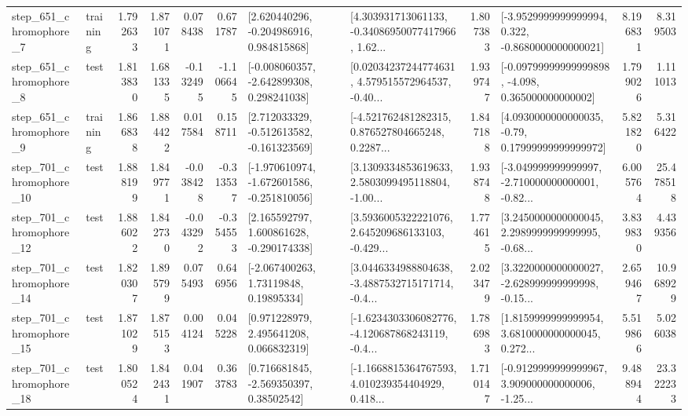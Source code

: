 \begin{tabular}{llrrrrllrlrr}
   step\_651\_chromophore\_7 &  training &      1.792633 &    1.871071 &      0.078438 &  0.671787 &    [2.620440296, -0.204986916, 0.984815868] &  [4.303931713061133, -0.34086950077417966, 1.62... &       1.807383 &  [-3.9529999999999994, 0.322, -0.8680000000000021] &            8.196831 &          8.319503 \\
   step\_651\_chromophore\_8 &      test &      1.813830 &    1.681335 &     -0.132495 & -1.106645 &   [-0.008060357, -2.642899308, 0.298241038] &  [0.02034237244774631, 4.579515572964537, -0.40... &       1.939747 &  [-0.09799999999999898, -4.098, 0.365000000000002] &            1.799026 &          1.111013 \\
   step\_651\_chromophore\_9 &  training &      1.866838 &    1.884422 &      0.017584 &  0.158711 &   [2.712033329, -0.512613582, -0.161323569] &  [-4.521762481282315, 0.876527804665248, 0.2287... &       1.847188 &   [4.0930000000000035, -0.79, 0.17999999999999972] &            5.821820 &          5.316422 \\
  step\_701\_chromophore\_10 &      test &      1.888199 &    1.849771 &     -0.038428 & -0.313537 &  [-1.970610974, -1.672601586, -0.251810056] &  [3.1309334853619633, 2.5803099495118804, -1.00... &       1.938748 &  [-3.049999999999997, -2.710000000000001, -0.82... &            6.005764 &         25.478518 \\
  step\_701\_chromophore\_12 &      test &      1.886022 &    1.842730 &     -0.043292 & -0.354553 &    [2.165592797, 1.600861628, -0.290174338] &  [3.5936005322221076, 2.645209686133103, -0.429... &       1.774615 &  [3.2450000000000045, 2.2989999999999995, -0.68... &            3.839830 &          4.439356 \\
  step\_701\_chromophore\_14 &      test &      1.820307 &    1.895799 &      0.075493 &  0.646956 &      [-2.067400263, 1.73119848, 0.19895334] &  [3.0446334988804638, -3.4887532715171714, -0.4... &       2.023479 &  [3.3220000000000027, -2.628999999999998, -0.15... &            2.659467 &         10.968929 \\
  step\_701\_chromophore\_15 &      test &      1.871029 &    1.875153 &      0.004124 &  0.045228 &     [0.971228979, 2.495641208, 0.066832319] &  [-1.6234303306082776, -4.120687868243119, -0.4... &       1.786983 &  [1.8159999999999954, 3.6810000000000045, 0.272... &            5.519866 &          5.026038 \\
  step\_701\_chromophore\_18 &      test &      1.800524 &    1.842431 &      0.041907 &  0.363783 &     [0.716681845, -2.569350397, 0.38502542] &  [-1.1668815364767593, 4.010239354404929, 0.418... &       1.710147 &  [-0.9129999999999967, 3.909000000000006, -1.25... &            9.488944 &         23.322233 \\

\end{tabular}
